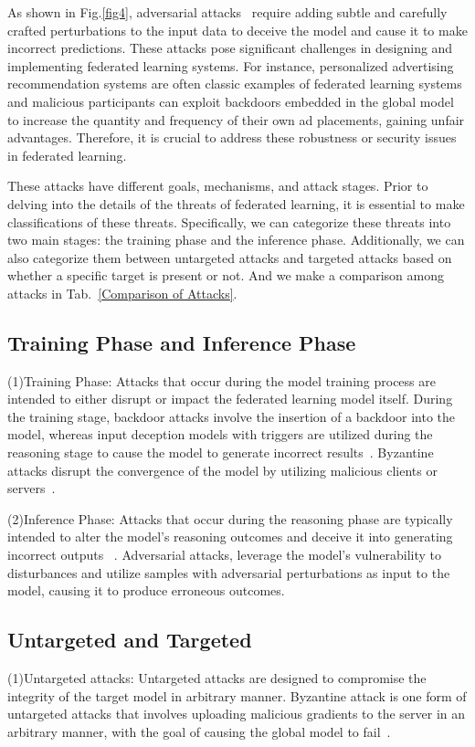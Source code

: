 As shown in Fig.\ref{fig4}, adversarial attacks~\cite{zizzo2020fat,chen2022calfat,li2023federated,zhang2023delving}
require adding subtle and carefully crafted perturbations
to the input data to deceive the model and cause it to
make incorrect predictions. These attacks pose significant challenges in designing and implementing federated
learning systems. For instance, personalized advertising
recommendation systems are often classic examples of
federated learning systems and malicious participants
can exploit backdoors embedded in the global model
to increase the quantity and frequency of their own ad
placements, gaining unfair advantages. Therefore, it is crucial to address these robustness or security issues in
federated learning. 

These attacks have different goals, mechanisms, and
attack stages. Prior to delving into the details of the
threats of federated learning, it is essential to make classifications
of these threats. Specifically, we can categorize
these threats into two main stages: the training phase and
the inference phase. Additionally, we can also categorize
them between untargeted attacks and targeted attacks
based on whether a specific target is present or not. And
we make a comparison among attacks in Tab.~\ref{Comparison of Attacks}. 

\subsection{Training Phase and Inference Phase}
(1)Training Phase: Attacks that occur during the model
training process are intended to either disrupt or impact
the federated learning model itself. During the training
stage, backdoor attacks involve the insertion of a backdoor
into the model, whereas input deception models with
triggers are utilized during the reasoning stage to cause
the model to generate incorrect results~\cite{miao2018towards,zhang2019data}. Byzantine
attacks disrupt the convergence of the model by utilizing
malicious clients or servers~\cite{fang2020local}.  

(2)Inference Phase: Attacks that occur during the
reasoning phase are typically intended to alter the model's
reasoning outcomes and deceive it into generating incorrect
outputs~\cite{barreno2006can} . Adversarial attacks, leverage the model's
vulnerability to disturbances and utilize samples with
adversarial perturbations as input to the model, causing
it to produce erroneous outcomes.  

\subsection{Untargeted and Targeted}
(1)Untargeted attacks: Untargeted attacks are designed
to compromise the integrity of the target model in 
arbitrary manner. Byzantine attack is one form of untargeted
attacks that involves uploading malicious gradients to the
server in an arbitrary manner, with the goal of causing
the global model to fail~\cite{lamport2019byzantine,xie2020fall,bernstein2018signsgd,damaskinos2019aggregathor}.  

